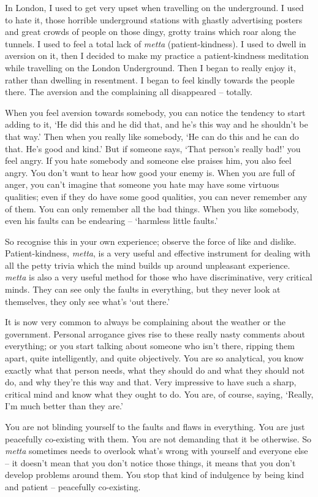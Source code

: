 In London, I used to get very upset when travelling on the underground. I used to hate it, those horrible underground stations with ghastly advertising posters and great crowds of people on those dingy, grotty trains which roar along the tunnels. I used to feel a total lack of \textit{metta} (patient-kindness). I used to dwell in aversion on it, then I decided to make my practice a patient-kindness meditation while travelling on the London Underground. Then I began to really enjoy it, rather than dwelling in resentment. I began to feel kindly towards the people there. The aversion and the complaining all disappeared -- totally.

When you feel aversion towards somebody, you can notice the tendency to start adding to it, `He did this and he did that, and he's this way and he shouldn't be that way.' Then when you really like somebody, `He can do this and he can do that. He's good and kind.' But if someone says, `That person's really bad!' you feel angry. If you hate somebody and someone else praises him, you also feel angry. You don't want to hear how good your enemy is. When you are full of anger, you can't imagine that someone you hate may have some virtuous qualities; even if they do have some good qualities, you can never remember any of them. You can only remember all the bad things. When you like somebody, even his faults can be endearing -- `harmless little faults.'

So recognise this in your own experience; observe the force of like and dislike. Patient-kindness, \textit{metta}, is a very useful and effective instrument for dealing with all the petty trivia which the mind builds up around unpleasant experience. \textit{metta} is also a very useful method for those who have discriminative, very critical minds. They can see only the faults in everything, but they never look at themselves, they only see what's `out there.'

It is now very common to always be complaining about the weather or the government. Personal arrogance gives rise to these really nasty comments about everything; or you start talking about someone who isn't there, ripping them apart, quite intelligently, and quite objectively. You are so analytical, you know exactly what that person needs, what they should do and what they should not do, and why they're this way and that. Very impressive to have such a sharp, critical mind and know what they ought to do. You are, of course, saying, `Really, I'm much better than they are.'

You are not blinding yourself to the faults and flaws in everything. You are just peacefully co-existing with them. You are not demanding that it be otherwise. So \textit{metta} sometimes needs to overlook what's wrong with yourself and everyone else -- it doesn't mean that you don't notice those things, it means that you don't develop problems around them. You stop that kind of indulgence by being kind and patient -- peacefully co-existing.

